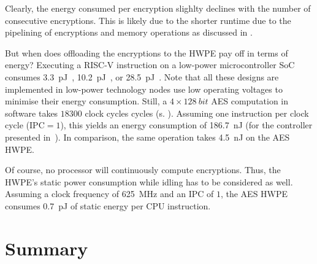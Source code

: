 \documentclass[a4paper, 12pt]{article}
\begin{document}
Clearly, the energy consumed per encryption slighlty declines with the number of consecutive encryptions. This is likely due to the shorter runtime due to the pipelining of encryptions and memory operations as discussed in .

But when does offloading the encryptions to the HWPE pay off in terms of energy? Executing a RISC-V instruction on a low-power microcontroller SoC consumes \SI{3.3}{pJ}~\cite{Schiavone2018}, \SI{10.2}{pJ}~\cite{Ickes2011}, or \SI{28.5}{pJ}~\cite{Pullini2018}. Note that all these designs are implemented in low-power technology nodes use low operating voltages to minimise their energy consumption. Still, a $4\times\SI{128}{bit}$ AES computation in software takes $18300$ clock cycles cycles (s. ). Assuming one instruction per clock cycle ($\textrm{IPC}=1$), this yields an energy consumption of \SI{186.7}{nJ} (for the controller presented in~\cite{Ickes2011}). In comparison, the same operation takes \SI{4.5}{nJ} on the AES HWPE.

Of course, no processor will continuously compute encryptions. Thus, the HWPE's static power consumption while idling has to be considered as well. Assuming a clock frequency of \SI{625}{MHz} and an IPC of $1$, the AES HWPE consumes \SI{0.7}{pJ} of static energy per CPU instruction.


\section{Summary} \label{sec:summary}

\clearpage
\sloppy
\printbibliography
\end{document}
